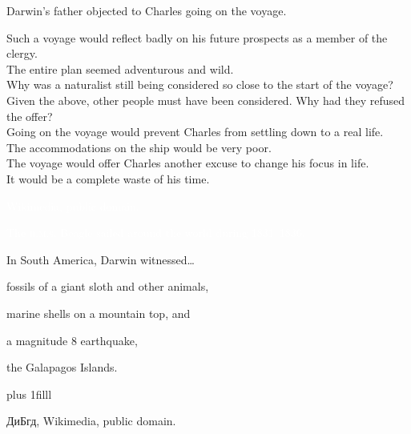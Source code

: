 \documentclass[t]{beamer}
\begin{document}
\begin{frame}[t]{Darwin's father objected to Charles going on the voyage.}

	Such a voyage would reflect badly on his future prospects as a member of the clergy. \\[0.5\baselineskip]
	
	The entire plan seemed adventurous and wild. \\[0.5\baselineskip]

	Why was a naturalist still being considered so close to the start of the voyage? \\[0.5\baselineskip]
	
	Given the above, other people must have been considered. Why had they refused the offer? \\[0.5\baselineskip]
	
	Going on the voyage would prevent Charles from settling down to a real life. \\[0.5\baselineskip]
	
	The accommodations on the ship would be very poor. \\[0.5\baselineskip]
	
	The voyage would offer Charles another excuse to change his focus in life. \\[0.5\baselineskip]
	
	It would be a complete waste of his time.
\end{frame}
%
{
\begin{frame}[b]

\hfill\tiny\textcolor{white}{Wikimedia, public domain.}
\end{frame}
}
%
{
\begin{frame}[plain]
\end{frame}
}
%
{
\begin{frame}[t]{\textcolor{white}{The \textsc{h.m.s.} Beagle sailed around the world during 1831--1836.}}
\end{frame}
}
%
{
\begin{frame}[t]{In South America, Darwin witnessed\ldots}

	\hangpara fossils of a giant sloth and other animals,

	\hangpara marine shells on a mountain top, and

	\hangpara a magnitude 8 earthquake,

	\hangpara the Galapagos Islands.

	\vskip0pt plus 1filll

	\hfill\tiny ДиБгд, Wikimedia, public domain.
\end{frame}
}
\end{document}

